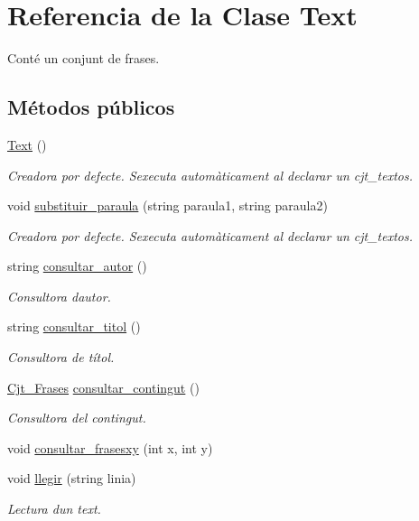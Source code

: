 \hypertarget{class_text}{}\section{Referencia de la Clase Text}
\label{class_text}


Conté un conjunt de frases.  


\subsection*{Métodos públicos}
\begin{DoxyCompactItemize}
\item 
\hyperlink{class_text_ab3e26143fccc52699bcc5149cae852bc}{Text} ()
\begin{DoxyCompactList}\small\item\em Creadora por defecte. S\textquotesingle{}executa automàticament al declarar un cjt\+\_\+textos. \end{DoxyCompactList}\item 
void \hyperlink{class_text_a03db3fb1c8edcc6f0b628f0864d865b7}{substituir\+\_\+paraula} (string paraula1, string paraula2)
\begin{DoxyCompactList}\small\item\em Creadora por defecte. S\textquotesingle{}executa automàticament al declarar un cjt\+\_\+textos. \end{DoxyCompactList}\item 
string \hyperlink{class_text_a0e8d29f53728da7b65ff1e87588ec407}{consultar\+\_\+autor} ()
\begin{DoxyCompactList}\small\item\em Consultora d\textquotesingle{}autor. \end{DoxyCompactList}\item 
string \hyperlink{class_text_ac33cbed6f5553a4901a8440e215befb6}{consultar\+\_\+titol} ()
\begin{DoxyCompactList}\small\item\em Consultora de títol. \end{DoxyCompactList}\item 
\hyperlink{class_cjt___frases}{Cjt\+\_\+\+Frases} \hyperlink{class_text_ae21dfb276d73f5a5b0994650335591c9}{consultar\+\_\+contingut} ()
\begin{DoxyCompactList}\small\item\em Consultora del contingut. \end{DoxyCompactList}\item 
void \hyperlink{class_text_aea3be7481256f9ae7121b7778c034e39}{consultar\+\_\+frasesxy} (int x, int y)
\item 
void \hyperlink{class_text_a4e7d5e74fb9065f9771bd33a5e263776}{llegir} (string linia)
\begin{DoxyCompactList}\small\item\em Lectura d\textquotesingle{}un text. \end{DoxyCompactList}\end{DoxyCompactItemize}


